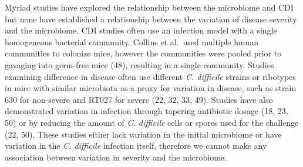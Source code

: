 \documentclass[
  12pt,
]{article}
\begin{document}
Myriad studies have explored the relationship between the microbiome and
CDI but none have established a relationship between the variation of
disease severity and the microbiome. CDI studies often use an infection
model with a single homogeneous bacterial community. Collins et al.~used
multiple human communities to colonize mice, however the communities
were pooled prior to gavaging into germ-free mice (48), resulting in a
single community. Studies examining difference in disease often use
different \emph{C. difficile} strains or ribotypes in mice with similar
microbiota as a proxy for variation in disease, such as strain 630 for
non-severe and RT027 for severe (22, 32, 33, 49). Studies have also
demonstrated variation in infection through tapering antibiotic dosage
(18, 23, 50) or by reducing the amount of \emph{C. difficile} cells or
spores used for the challenge (22, 50). These studies either lack
variation in the initial microbiome or have variation in the \emph{C.
difficile} infection itself, therefore we cannot make any association
between variation in severity and the microbiome.
\end{document}
